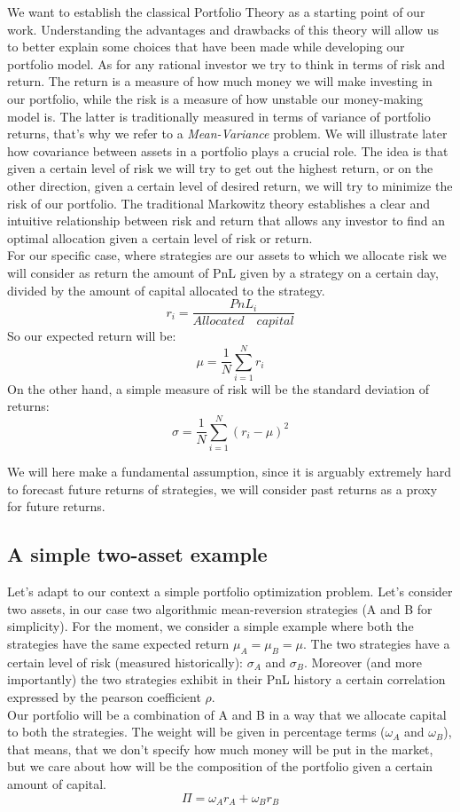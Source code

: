 \documentclass[a4paper]{article}
\numberwithin{equation}{subsection}
\begin{document}
We want to establish the classical Portfolio Theory as a starting point of our work. Understanding the advantages and drawbacks of this theory will allow us to better explain some choices that have been made while developing our portfolio model. As for any rational investor we try to think in terms of risk and return. The return is a measure of how much money we will make investing in our portfolio, while the risk is a measure of how unstable our money-making model is. The latter is traditionally measured in terms of variance of portfolio returns, that's why we refer to a \textit{Mean-Variance} problem. We will illustrate later how covariance between assets in a portfolio plays a crucial role. The idea is that given a certain level of risk we will try to get out the highest return, or on the other direction, given a certain level of desired return, we will try to minimize the risk of our portfolio. The traditional Markowitz theory establishes a clear and intuitive relationship between risk and return that allows any investor to find an optimal allocation given a certain level of risk or return.\\
For our specific case, where strategies are our assets to which we allocate risk we will consider as return the amount of PnL given by a strategy on a certain day, divided by the amount of capital allocated to the strategy.
$$
r_i = \frac{PnL_i}{Allocated \quad capital}
$$
So our expected return will be:
$$
\mu = \frac{1}{N}\sum\limits_{i=1}^N r_i
$$
On the other hand, a simple measure of risk will be the standard deviation of returns:
$$
\sigma = \frac{1}{N}\sum\limits_{i=1}^N (r_i - \mu)^2
$$

We will here make a fundamental assumption, since it is arguably extremely hard to forecast future returns of strategies, we will consider past returns as a proxy for future returns.\\

\subsection{A simple two-asset example}

Let's adapt to our context a simple portfolio optimization problem. Let's consider two assets, in our case two algorithmic mean-reversion strategies (A and B for simplicity). For the moment, we consider a simple example where both the strategies have the same expected return $\mu_A = \mu_B = \mu$.
The two strategies have a certain level of risk (measured historically): $\sigma_A$ and $\sigma_B$. Moreover (and more importantly) the two strategies exhibit in their PnL history a certain correlation expressed by the pearson coefficient $\rho$.\\
Our portfolio will be a combination of A and B in a way that we allocate capital to both the strategies. The weight will be given in percentage terms ($\omega_A$ and $\omega_B$), that means, that we don't specify how much money will be put in the market, but we care about how will be the composition of the portfolio given a certain amount of capital.
$$
\Pi = \omega_A r_A + \omega_B r_B
$$
\end{document}
